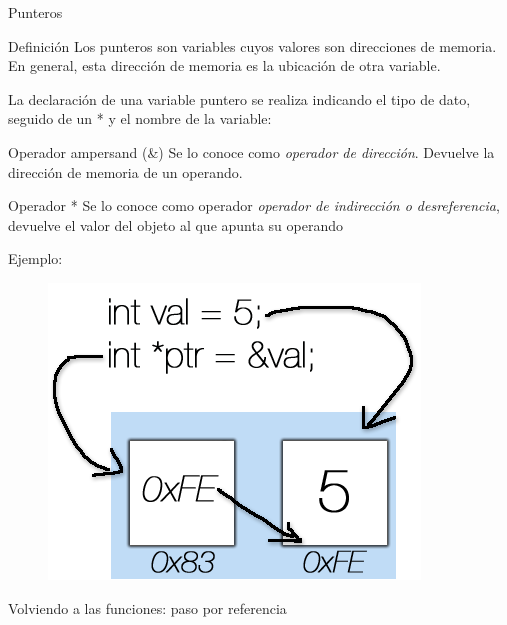 \documentclass[xcolor=pdftex,table,11pt]{beamer}
\begin{document}
\begin{frame}[allowframebreaks]{Punteros}
\begin{block}{Definición}
Los punteros son variables cuyos valores son direcciones de memoria. En general, esta dirección de memoria es la ubicación de otra variable.
\end{block}

La declaración de una variable puntero se realiza indicando el tipo de dato, seguido de un * y el nombre de la variable:


\codesetstylefrombeamer
{}



\begin{block}{Operador ampersand (\&)}
Se lo conoce como \textit{operador de dirección}. Devuelve la dirección de memoria de un operando.
\end{block}

\begin{block}{Operador *}
Se lo conoce como operador \textit{operador de indirección o desreferencia}, devuelve el valor del objeto al que apunta su operando
\end{block}

Ejemplo:

\codesetstylefrombeamer
{}


 \begin{figure}
 \centering
\includegraphics[scale=0.7]{../img/exported/pointers.png}
\end{figure}
\end{frame}

\codesetstylefrombeamer
{}

\begin{frame}[allowframebreaks]{Volviendo a las funciones: paso por referencia}
\codesetstylefrombeamer
{}
\end{frame}
\end{document}
